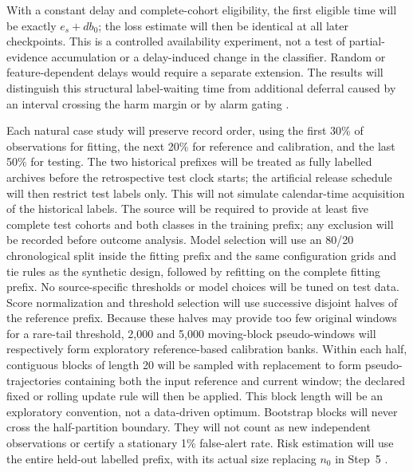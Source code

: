With a constant delay and complete-cohort eligibility, the first eligible time will be exactly $e_s+db_0$; the loss estimate will then be identical at all later checkpoints. This is a controlled availability experiment, not a test of partial-evidence accumulation or a delay-induced change in the classifier. Random or feature-dependent delays would require a separate extension. The results will distinguish this structural label-waiting time from additional deferral caused by an interval crossing the harm margin or by alarm gating \cite{pudd,alencar,window}.

Each natural case study will preserve record order, using the first 30\% of observations for fitting, the next 20\% for reference and calibration, and the last 50\% for testing. The two historical prefixes will be treated as fully labelled archives before the retrospective test clock starts; the artificial release schedule will then restrict test labels only. This will not simulate calendar-time acquisition of the historical labels. The source will be required to provide at least five complete test cohorts and both classes in the training prefix; any exclusion will be recorded before outcome analysis. Model selection will use an 80/20 chronological split inside the fitting prefix and the same configuration grids and tie rules as the synthetic design, followed by refitting on the complete fitting prefix. No source-specific thresholds or model choices will be tuned on test data. Score normalization and threshold selection will use successive disjoint halves of the reference prefix. Because these halves may provide too few original windows for a rare-tail threshold, 2,000 and 5,000 moving-block pseudo-windows will respectively form exploratory reference-based calibration banks. Within each half, contiguous blocks of length 20 will be sampled with replacement to form pseudo-trajectories containing both the input reference and current window; the declared fixed or rolling update rule will then be applied. This block length will be an exploratory convention, not a data-driven optimum. Bootstrap blocks will never cross the half-partition boundary. They will not count as new independent observations or certify a stationary 1\% false-alert rate. Risk estimation will use the entire held-out labelled prefix, with its actual size replacing $n_0$ in Step~5 \cite{souza,kunsch}.

